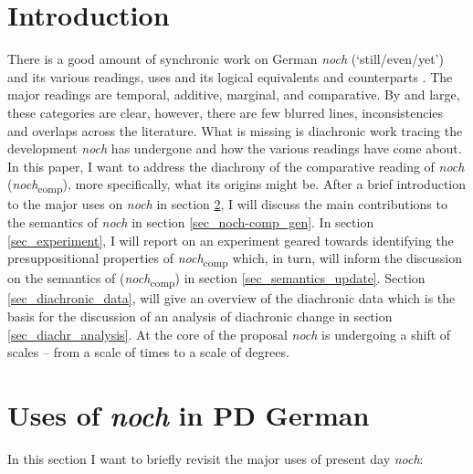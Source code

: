 \documentclass[output=paper,
modfonts
]{langscibook}
\author{Martin Kopf-Giammanco\affiliation{Universität des Saarlandes}}
\begin{document}
\maketitle

\section{Introduction}\label{sec_intro}
There is a good amount of synchronic work on German \textit{noch} (`still/even/yet') and its various readings, uses and its logical equivalents and counterparts \citep[e.g.][]{koenig1977,loebner1989,Ippolito2007,umbach2009a_comp,umbach2009b_add,umbach2012,beck2016a_sub,beck2016b_disc}. The major readings are temporal, additive, marginal, and comparative. By and large, these categories are clear, however, there are few blurred lines, inconsistencies and overlaps across the literature. What is missing is diachronic work tracing the development \textit{noch} has undergone and how the various readings have come about. In this paper, I want to address the diachrony of the comparative reading of \textit{noch} (\textit{noch}\textsubscript{comp}), more specifically, what its origins might be. After a brief introduction to the major uses on \textit{noch} in section \ref{sec_major_readings}, I will discuss the main contributions to the semantics of \textit{noch} in section \ref{sec_noch-comp_gen}. In section \ref{sec_experiment}, I will report on an experiment geared towards identifying the presuppositional properties of \textit{noch}\textsubscript{comp} which, in turn, will inform the discussion on the semantics of (\textit{noch}\textsubscript{comp}) in section \ref{sec_semantics_update}. Section \ref{sec_diachronic_data}, will give an overview of the diachronic data which is the basis for the discussion of an analysis of diachronic change in section \ref{sec_diachr_analysis}. At the core of the proposal \textit{noch} is undergoing a shift of scales -- from a scale of times to a scale of degrees. 

\section{Uses of \textit{noch} in PD German} \label{sec_major_readings}

In this section I want to briefly revisit the major uses of present day \textit{noch}:
\end{document}
